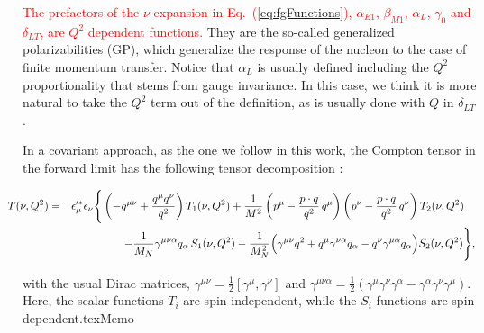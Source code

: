 \documentclass[twocolumn,prc,showpacs,nofootinbib,preprintnumbers,amsmath,amssymb,superscriptaddress]{revtex4-1}
\def\bea{\begin{eqnarray}}
\def\eea{\end{eqnarray}}
\def\eqlab#1{\label{eq:#1}}
\def\Eqref#1{Eq.~(\ref{eq:#1})}
\def\al{\alpha}
\def\ga{\gamma} \def\Ga{{\it\Gamma}}
\def\nn{\nonumber}
\begin{document}
\textcolor{red}{The prefactors of the $\nu$ expansion in \Eqref{fgFunctions}, $\alpha_{E1}$, $\beta_{M1}$, $\alpha_{L}$, $\gamma_{0}$ and $\delta_{LT}$, are $Q^2$ dependent functions.}
They  are the so-called generalized polarizabilities (GP), which generalize the response of the nucleon to the case of finite momentum transfer. Notice that $\alpha_L$ is usually defined including the $Q^2$ proportionality that stems from gauge invariance. 
In this case, we think it is more natural to take the $Q^2$ term out of the definition, as is usually done with $Q$ in $\delta_{LT}$.

In a covariant approach, as the one we follow in this work, the Compton tensor in the forward limit has the following tensor decomposition \cite{Hagelstein:2015egb}:
\begin{widetext}
\bea
\label{Eq:T-Rel}
\hspace{-0.5cm}T(\nu,Q^2) & = &  \epsilon_{\mu}^{\prime *} \epsilon_\nu \Bigg\{ 
\left( -g^{\mu\nu}+\frac{q^{\mu}q^{\nu}}{q^2}\right)
T_1(\nu, Q^2) +\frac{1}{M^2} \left(p^{\mu}-\frac{p\cdot
q}{q^2}\,q^{\mu}\right) \left(p^{\nu}-\frac{p\cdot
q}{q^2}\, q^{\nu} \right) T_2(\nu, Q^2)\nn\quad\\
&&-   \frac{1}{M_N}\gamma^{\mu \nu \al} q_\al \,S_1(\nu, Q^2)  -  
\frac{1}{M_N^2} \Big( \gamma^{\mu\nu} q^2 + q^\mu \gamma^{\nu\al} q_\al  -  q^\nu \gamma^{\mu\al}
q_\al \Big) S_2(\nu, Q^2)\Bigg\},
\eqlab{fVVCS}
\eea
\end{widetext}
with the usual Dirac matrices, $\gamma^{\mu \nu}=\frac{1}{2}\left[\gamma^\mu,\gamma^\nu\right]$ and 
$\gamma^{\mu \nu \al}=\frac{1}{2} \left(\gamma^\mu\gamma^\nu \ga^\al-\ga^\al \ga^\nu \ga^\mu \right)$.
Here, the scalar functions $T_i$ are spin independent, while the $S_i$ functions are spin dependent.texMemo
\end{document}

